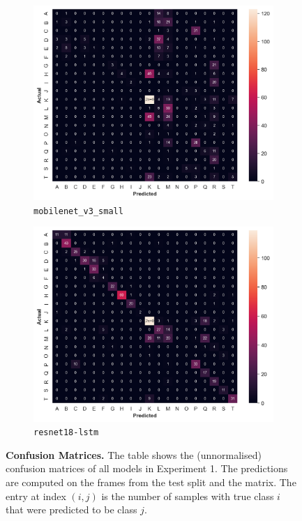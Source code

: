 \documentclass[a4paper]{article}
\begin{document}
\begin{figure}[b]
\begin{subfigure}{.33\textwidth}
    \end{subfigure}
    \begin{subfigure}{.33\textwidth}
        \centering
        \includegraphics[width=\textwidth]
        {figures/experiment1-conf-matrix-mobilenet_v3_small.png}
        \caption{\texttt{mobilenet\_v3\_small}}
    \end{subfigure}%
    \begin{subfigure}{.33\textwidth}
        \centering
        \includegraphics[width=\textwidth]
        {figures/experiment1-conf-matrix-resnet18-lstm.png}
        \caption{\texttt{resnet18-lstm}}
    \end{subfigure}%

    \caption{
      \textbf{Confusion Matrices.} The table shows the (unnormalised) confusion
      matrices of all models in Experiment 1. The predictions are computed on
      the frames from the test split and the matrix. The entry at index $(i,j)$
      is the number of samples with true class $i$ that were predicted to be
      class $j$.
    }

    \label{fig:conf-matrices-experiment1}
  \end{figure}

  \newpage
  \restoregeometry

  
\end{document}
